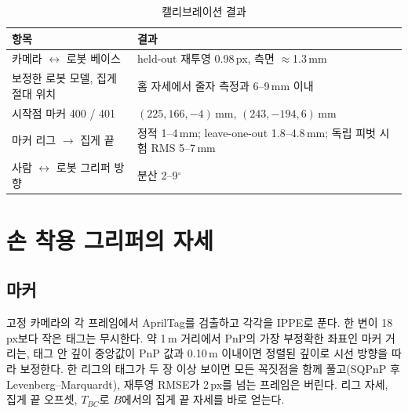 \documentclass[conference,10pt]{IEEEtran}
\newcommand{\mm}{\,mm\xspace}
\begin{document}
\begin{table}[t]
\caption{캘리브레이션 결과}\label{tab:cal}
\centering\small
\begin{tabular}{@{}>{\raggedright\arraybackslash}p{}>{\raggedright\arraybackslash}p{}@{}}
\toprule
항목 & 결과 \\
\midrule
카메라 $\leftrightarrow$ 로봇 베이스 & held-out 재투영 0.98\,px, 측면 $\approx$1.3\mm \\
보정한 로봇 모델, 집게 절대 위치 & 홈 자세에서 줄자 측정과 6--9\mm 이내 \\
시작점 마커 400 / 401 & $(225, 166, -4)$\mm, $(243, -194, 6)$\mm \\
마커 리그 $\to$ 집게 끝 & 정적 1--4\mm; leave-one-out 1.8--4.8\mm; 독립 피벗 시험 RMS 5--7\mm \\
사람 $\leftrightarrow$ 로봇 그리퍼 방향 & 분산 2--9$^\circ$ \\
\bottomrule
\end{tabular}
\end{table}

\section{손 착용 그리퍼의 자세}\label{sec:pose}
\subsection{마커}
고정 카메라의 각 프레임에서 AprilTag를 검출하고 각각을 IPPE로 푼다. 한 변이 18\,px보다 작은 태그는 무시한다. 약 1\,m 거리에서
PnP의 가장 부정확한 좌표인 마커 거리는, 태그 안 깊이 중앙값이 PnP 값과 0.10\,m 이내이면 정렬된 깊이로 시선 방향을 따라 보정한다.
한 리그의 태그가 두 장 이상 보이면 모든 꼭짓점을 함께 풀고(SQPnP 후 Levenberg--Marquardt), 재투영 RMSE가 2\,px를 넘는 프레임은
버린다. 리그 자세, 집게 끝 오프셋, $T_{BC}$로 $B$에서의 집게 끝 자세를 바로 얻는다.
\end{document}
